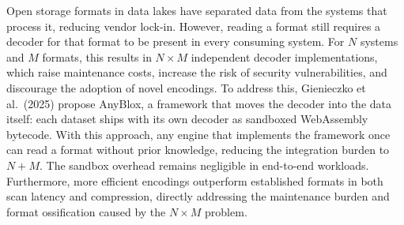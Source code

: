 Open storage formats in data lakes have separated data from the systems that process it, reducing vendor lock-in. However, reading a format still requires a decoder for that format to be present in every consuming system. For $N$ systems and $M$ formats, this results in $N \times M$ independent decoder implementations, which raise maintenance costs, increase the risk of security vulnerabilities, and discourage the adoption of novel encodings. To address this, Gienieczko et al.\ (2025) propose AnyBlox, a framework that moves the decoder into the data itself: each dataset ships with its own decoder as sandboxed WebAssembly bytecode. With this approach, any engine that implements the framework once can read a format without prior knowledge, reducing the integration burden to $N + M$. The sandbox overhead remains negligible in end-to-end workloads. Furthermore, more efficient encodings outperform established formats in both scan latency and compression, directly addressing the maintenance burden and format ossification caused by the $N \times M$ problem.